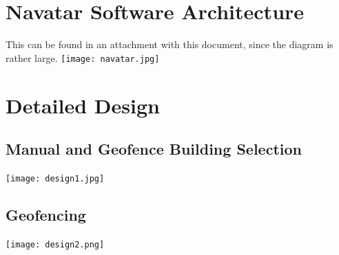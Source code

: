 \documentclass{scrreprt}
\begin{document}
	\section{Navatar Software Architecture}
		This can be found in an attachment with this document, since the diagram is rather large.
		\texttt{[image: navatar.jpg]}
	\pagebreak
	\section{Detailed Design}
		\subsection{Manual and Geofence Building Selection}
			\texttt{[image: design1.jpg]}
		\pagebreak	
		\subsection{Geofencing}
			\texttt{[image: design2.png]}
\end{document}
